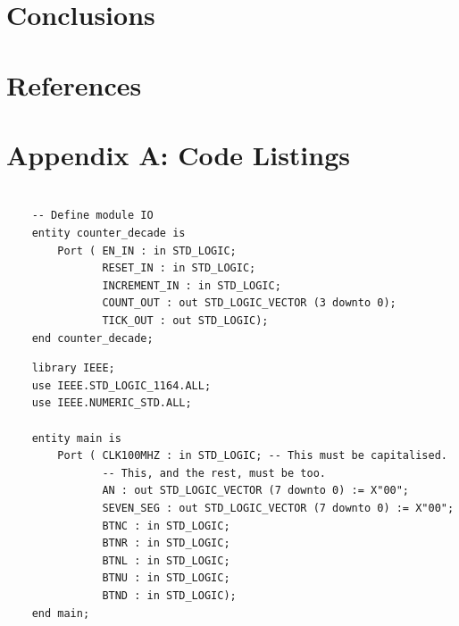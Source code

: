 \documentclass[11pt]{article}
\newenvironment{code}{\captionsetup{type=listing}}{}
\begin{document}
\section{Conclusions}


\newpage

\section{References}
\printbibliography

\newpage

\section{Appendix A: Code Listings}

\begin{code}
  \begin{verbatim}
  
    -- Define module IO
    entity counter_decade is
        Port ( EN_IN : in STD_LOGIC;
               RESET_IN : in STD_LOGIC;
               INCREMENT_IN : in STD_LOGIC;
               COUNT_OUT : out STD_LOGIC_VECTOR (3 downto 0);
               TICK_OUT : out STD_LOGIC);
    end counter_decade;

  \end{verbatim}
  \captionsetup{belowskip=0pt}
  \label{code:entity_naming_convention}
\end{code}

\vspace*{1cm}

\begin{code}
  \begin{verbatim}
    library IEEE;
    use IEEE.STD_LOGIC_1164.ALL;
    use IEEE.NUMERIC_STD.ALL;

    entity main is
        Port ( CLK100MHZ : in STD_LOGIC; -- This must be capitalised.
               -- This, and the rest, must be too.
               AN : out STD_LOGIC_VECTOR (7 downto 0) := X"00"; 
               SEVEN_SEG : out STD_LOGIC_VECTOR (7 downto 0) := X"00";
               BTNC : in STD_LOGIC;
               BTNR : in STD_LOGIC;
               BTNL : in STD_LOGIC;
               BTNU : in STD_LOGIC;
               BTND : in STD_LOGIC);  
    end main;
  \end{verbatim}
  \captionsetup{belowskip=0pt}
  \label{code:case}
\end{code}
\end{document}
